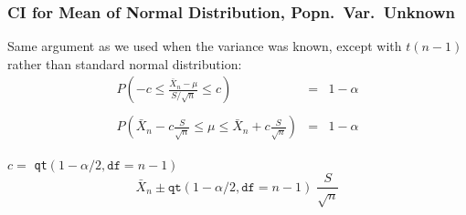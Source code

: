 \begin{frame}
\frametitle{CI for Mean of Normal Distribution, Popn.\ Var.\ Unknown}
Same argument as we used when the variance was known, except with $t(n-1)$ rather than standard normal distribution:
	\begin{eqnarray*}
		P\left(-c \leq \frac{\bar{X}_n-\mu}{S/\sqrt{n}} \leq c \right) &=& 1-\alpha \\ \\ 
		P\left(\bar{X}_n - c \frac{S}{\sqrt{n}} \leq \mu\leq \bar{X}_n +c \frac{S}{\sqrt{n}} \right) &=& 1-\alpha 
	\end{eqnarray*}

\alert{$c =$ \texttt{qt}$(1-\alpha/2, \texttt{df} = n-1)$} 
	$$\boxed{\bar{X}_n \pm \texttt{qt}(1-\alpha/2, \texttt{df} = n-1)\;  \frac{S}{\sqrt{n}}}$$
\end{frame}



